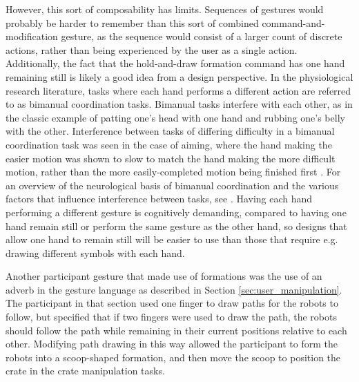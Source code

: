 However, this sort of composability has limits. 
Sequences of gestures would probably be harder to remember than this sort of combined command-and-modification gesture, as the sequence would consist of a larger count of discrete actions, rather than being experienced by the user as a single action. 
Additionally, the fact that the hold-and-draw formation command has one hand remaining still is likely a good idea from a design perspective. 
In the physiological research literature, tasks where each hand performs a different action are referred to as bimanual coordination tasks.
Bimanual tasks interfere with each other, as in the classic example of patting one's head with one hand and rubbing one's belly with the other. 
Interference between tasks of differing difficulty in a bimanual coordination task was seen in the case of aiming, where the hand making the easier motion was shown to slow to match the hand making the more difficult motion, rather than the more easily-completed motion being finished first \citep{fitts1954information}.
For an overview of the neurological basis of bimanual coordination and the various factors that influence interference between tasks, see \citep{swinnen2004two}. 
Having each hand performing a different gesture is cognitively demanding, compared to having one hand remain still or perform the same gesture as the other hand, so designs that allow one hand to remain still will be easier to use than those that require e.g. drawing different symbols with each hand. 

Another participant gesture that made use of formations was the use of an adverb in the gesture language as described in Section \ref{sec:user_manipulation}. 
The participant in that section used one finger to draw paths for the robots to follow, but specified that if two fingers were used to draw the path, the robots should follow the path while remaining in their current positions relative to each other. 
Modifying path drawing in this way allowed the participant to form the robots into a scoop-shaped formation, and then move the scoop to position the crate in the crate manipulation tasks. 

